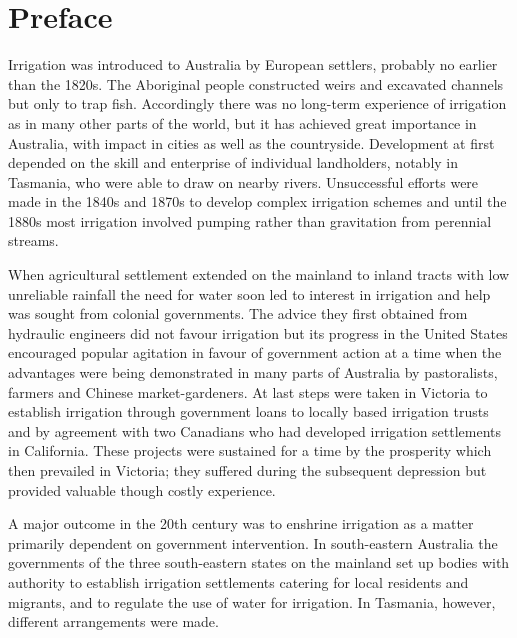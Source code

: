 
\setcounter{endnote}{0}

\chapter{Preface}
\label{ch:intro}

Irrigation was introduced to Australia by European settlers, probably
no earlier than the 1820s.  The Aboriginal people
constructed weirs and excavated channels but only to trap fish.
Accordingly there was no long-term experience of irrigation as in many
other parts of the world, but it has achieved great importance in
Australia, with impact in cities as well as the countryside.
Development at first depended on the skill and enterprise of
individual landholders, notably in Tasmania, who were able to draw on
nearby rivers.  Unsuccessful efforts were made in the 1840s and 1870s
to develop complex irrigation schemes and until the 1880s most
irrigation involved pumping rather than gravitation from perennial
streams.

When agricultural settlement extended on the mainland to inland tracts
with low unreliable rainfall the need for water soon led to interest
in irrigation and help was sought from colonial governments.  The
advice they first obtained from hydraulic engineers did not favour
irrigation but its progress in the United States encouraged popular
agitation in favour of government action at a time when the advantages
were being demonstrated in many parts of Australia by pastoralists,
farmers and Chinese market-gardeners.  At last steps
were taken in Victoria to establish irrigation through government
loans to locally based irrigation trusts and by agreement with two
Canadians who had developed irrigation settlements in California.
These projects were sustained for a time by the prosperity which then
prevailed in Victoria; they suffered during the subsequent depression
but provided valuable though costly experience.

A major outcome in the 20th century was to enshrine irrigation as a
matter primarily dependent on government intervention.  In
south-eastern Australia the governments of the three south-eastern
states on the mainland set up bodies with authority to establish
irrigation settlements catering for local residents and migrants, and
to regulate the use of water for irrigation.  In Tasmania, however,
different arrangements were made.

